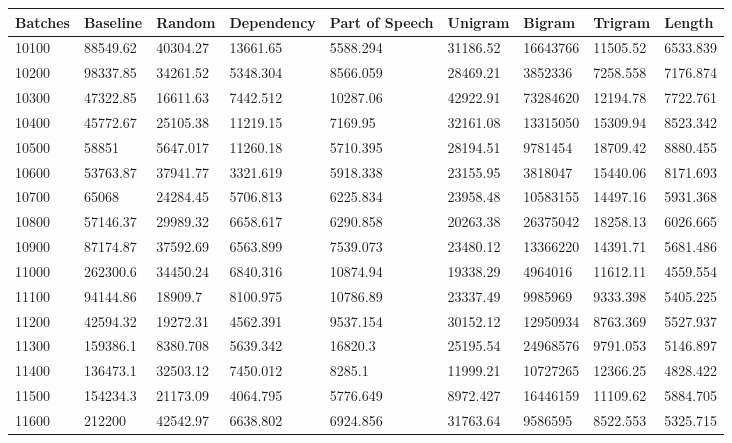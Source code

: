 \documentclass [11pt, proquest] {uwthesis}[2020/12/20]
\begin{document}
\begin{table}
\begin{tiny}
\centering
\begin{tabular}{|l|l|l|l|l|l|l|l|l|}
\hline
Batches & Baseline & Random & Dependency & Part of Speech & Unigram & Bigram & Trigram & Length \\ \hline
10100 & 88549.62 & 40304.27 & 13661.65 & 5588.294 & 31186.52 & 16643766 & 11505.52 & 6533.839 \\\hline
10200 & 98337.85 & 34261.52 & 5348.304 & 8566.059 & 28469.21 & 3852336 & 7258.558 & 7176.874 \\\hline
10300 & 47322.85 & 16611.63 & 7442.512 & 10287.06 & 42922.91 & 73284620 & 12194.78 & 7722.761 \\\hline
10400 & 45772.67 & 25105.38 & 11219.15 & 7169.95 & 32161.08 & 13315050 & 15309.94 & 8523.342 \\\hline
10500 & 58851 & 5647.017 & 11260.18 & 5710.395 & 28194.51 & 9781454 & 18709.42 & 8880.455 \\\hline
10600 & 53763.87 & 37941.77 & 3321.619 & 5918.338 & 23155.95 & 3818047 & 15440.06 & 8171.693 \\\hline
10700 & 65068 & 24284.45 & 5706.813 & 6225.834 & 23958.48 & 10583155 & 14497.16 & 5931.368 \\\hline
10800 & 57146.37 & 29989.32 & 6658.617 & 6290.858 & 20263.38 & 26375042 & 18258.13 & 6026.665 \\\hline
10900 & 87174.87 & 37592.69 & 6563.899 & 7539.073 & 23480.12 & 13366220 & 14391.71 & 5681.486 \\\hline
11000 & 262300.6 & 34450.24 & 6840.316 & 10874.94 & 19338.29 & 4964016 & 11612.11 & 4559.554 \\\hline
11100 & 94144.86 & 18909.7 & 8100.975 & 10786.89 & 23337.49 & 9985969 & 9333.398 & 5405.225 \\\hline
11200 & 42594.32 & 19272.31 & 4562.391 & 9537.154 & 30152.12 & 12950934 & 8763.369 & 5527.937 \\\hline
11300 & 159386.1 & 8380.708 & 5639.342 & 16820.3 & 25195.54 & 24968576 & 9791.053 & 5146.897 \\\hline
11400 & 136473.1 & 32503.12 & 7450.012 & 8285.1 & 11999.21 & 10727265 & 12366.25 & 4828.422 \\\hline
11500 & 154234.3 & 21173.09 & 4064.795 & 5776.649 & 8972.427 & 16446159 & 11109.62 & 5884.705 \\\hline
11600 & 212200 & 42542.97 & 6638.802 & 6924.856 & 31763.64 & 9586595 & 8522.553 & 5325.715 \\\hline

\end{tabular}
\end{tiny}
\end{table}
\end{document}
